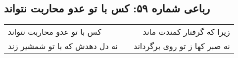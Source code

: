 \begin{center}
\section*{رباعی شماره ۵۹: کس با تو عدو محاربت نتواند}
\label{sec:059}
\begin{longtable}{l p{0.5cm} r}
کس با تو عدو محاربت نتواند
&&
زیرا که گرفتار کمندت ماند
\\
نه دل دهدش که با تو شمشیر زند
&&
نه صبر کها ز تو روی برگرداند
\\
\end{longtable}
\end{center}
